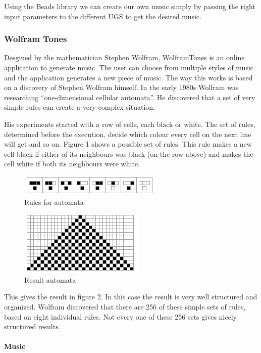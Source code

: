 \documentclass[12pt]{article}
\begin{document}
Using the Beads library we can create our own music simply by passing the right input parameters to the different UGS to get the desired music.

\subsubsection{Wolfram Tones}

Desgined by the mathematician Stephen Wolfram, WolframTones is an online application to generate music. The user can choose from multiple styles of music and the application generates a new piece of music. The way this works is based on a discovery of Stephen Wolfram himself. In the early 1980s Wolfram was researching ``one-dimensional cellular automata''. He discovered that a set of very simple rules can create a very complex situation. 

His experiments started with a row of cells, each black or white. The set of rules, determined before the execution, decide which colour every cell on the next line will get and so on. Figure 1 shows a possible set of rules. This rule makes a new cell black if either of its neighbours was black (on the row above) and makes the cell white if both its neighbours were white.

\begin{figure}[h]
\centering
\includegraphics[]{img/wolframRules}
\caption{Rules for automata}
\end{figure}

\begin{figure}[h]
\centering
\includegraphics[]{img/wolframResult-15}
\caption{Result automata}
\end{figure}

This gives the result in figure 2. In this case the result is very well structured and organized. Wolfram discovered that there are 256 of these simple sets of rules, based on eight individual rules. Not every one of these 256 sets gives nicely structured results.

\paragraph{Music}
\end{document}
